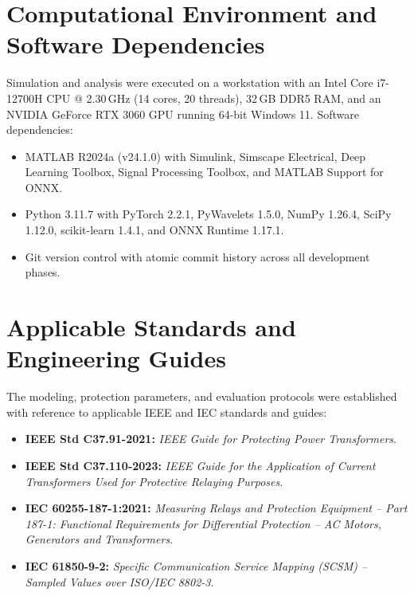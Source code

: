 \documentclass[12pt,a4paper,oneside]{report}
\begin{document}
\section{Computational Environment and Software Dependencies}
Simulation and analysis were executed on a workstation with an Intel Core i7-12700H CPU @ 2.30\,GHz (14 cores, 20 threads), 32\,GB DDR5 RAM, and an NVIDIA GeForce RTX 3060 GPU running 64-bit Windows 11. Software dependencies:
\begin{itemize}[leftmargin=1.4em,itemsep=2pt]
\item MATLAB R2024a (v24.1.0) with Simulink, Simscape Electrical, Deep Learning Toolbox, Signal Processing Toolbox, and MATLAB Support for ONNX.
\item Python 3.11.7 with PyTorch 2.2.1, PyWavelets 1.5.0, NumPy 1.26.4, SciPy 1.12.0, scikit-learn 1.4.1, and ONNX Runtime 1.17.1.
\item Git version control with atomic commit history across all development phases.
\end{itemize}

\section{Applicable Standards and Engineering Guides}
The modeling, protection parameters, and evaluation protocols were established with reference to applicable IEEE and IEC standards and guides:
\begin{itemize}[leftmargin=1.4em,itemsep=2pt]
\item \textbf{IEEE Std C37.91-2021:} \textit{IEEE Guide for Protecting Power Transformers}.
\item \textbf{IEEE Std C37.110-2023:} \textit{IEEE Guide for the Application of Current Transformers Used for Protective Relaying Purposes}.
\item \textbf{IEC 60255-187-1:2021:} \textit{Measuring Relays and Protection Equipment -- Part 187-1: Functional Requirements for Differential Protection -- AC Motors, Generators and Transformers}.
\item \textbf{IEC 61850-9-2:} \textit{Specific Communication Service Mapping (SCSM) -- Sampled Values over ISO/IEC 8802-3}.
\end{itemize}
\end{document}
